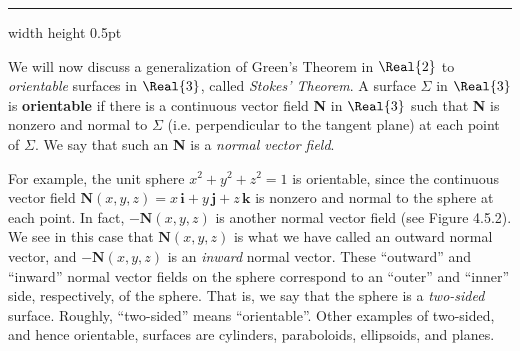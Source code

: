 \hrule width \textwidth height 0.5pt
\vspace{3mm}

We will now discuss a generalization of Green's Theorem in $\Real{2}$ to \emph{orientable} surfaces in $\Real{3}$,
called \emph{Stokes' Theorem}. A surface $\Sigma$ in
$\Real{3}$ is \textbf{orientable} if there is a continuous vector field \textbf{N} in $\Real{3}$ such that
\textbf{N} is nonzero and normal to $\Sigma$ (i.e. perpendicular to the tangent plane) at each point of $\Sigma$. We say
that such an \textbf{N} is a \emph{normal vector field}.

\piccaption[]{}
For example, the unit sphere $x^2 + y^2 + z^2 = 1$ is orientable, since the continuous vector field
$\textbf{N}(x,y,z) = x\,\textbf{i} + y\,\textbf{j} + z\,\textbf{k}$ is nonzero and normal to the sphere at each point.
In fact, $-\textbf{N}(x,y,z)$ is another normal vector field (see Figure 4.5.2). We see in this case that
$\textbf{N}(x,y,z)$ is what we have called an outward normal vector, and $-\textbf{N}(x,y,z)$ is an \emph{inward} normal
vector. These ``outward'' and ``inward'' normal vector fields on the sphere correspond to an ``outer'' and
``inner'' side, respectively, of the sphere.
That is, we say that the sphere is a \emph{two-sided} surface.
Roughly, ``two-sided'' means ``orientable''.
Other examples of two-sided, and hence orientable, surfaces are
cylinders, paraboloids, ellipsoids, and planes.

